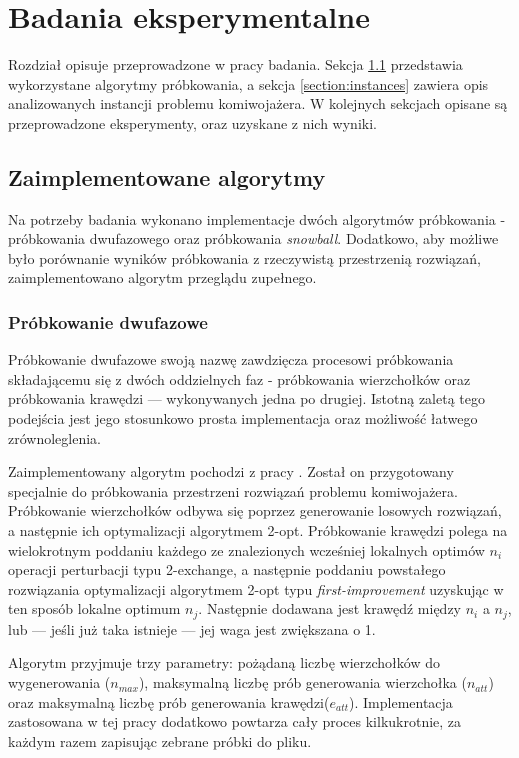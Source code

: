 \chapter{Badania eksperymentalne}

Rozdział opisuje przeprowadzone w pracy badania. Sekcja \ref{section:algorithms} przedstawia wykorzystane algorytmy próbkowania,
a sekcja \ref{section:instances} zawiera opis analizowanych instancji problemu komiwojażera.
W kolejnych sekcjach opisane są przeprowadzone eksperymenty, oraz uzyskane z nich wyniki.

\section{Zaimplementowane algorytmy} \label{section:algorithms}

Na potrzeby badania wykonano implementacje dwóch algorytmów próbkowania - próbkowania dwufazowego oraz próbkowania \textit{snowball}.
Dodatkowo, aby możliwe było porównanie wyników próbkowania z rzeczywistą przestrzenią rozwiązań, zaimplementowano algorytm
przeglądu zupełnego.

\subsection{Próbkowanie dwufazowe} \label{section:tp}
Próbkowanie dwufazowe swoją nazwę zawdzięcza procesowi próbkowania składającemu się z dwóch oddzielnych faz
- próbkowania wierzchołków oraz próbkowania krawędzi --- wykonywanych jedna po drugiej.
Istotną zaletą tego podejścia jest jego stosunkowo prosta implementacja oraz możliwość łatwego zrównoleglenia.

Zaimplementowany algorytm pochodzi z pracy \cite{DBLP:conf/depcos/BozejkoGNAB18}.
Został on przygotowany specjalnie do próbkowania przestrzeni rozwiązań problemu komiwojażera.
Próbkowanie wierzchołków odbywa się poprzez generowanie losowych rozwiązań, a następnie ich optymalizacji algorytmem 2-opt.
Próbkowanie krawędzi polega na wielokrotnym poddaniu każdego ze znalezionych wcześniej lokalnych optimów $n_i$ operacji perturbacji typu 2-exchange,
a następnie poddaniu powstałego rozwiązania optymalizacji algorytmem 2-opt typu \textit{first-improvement} uzyskując w ten sposób lokalne optimum $n_j$.
Następnie dodawana jest krawędź między $n_i$ a $n_j$, lub --- jeśli już taka istnieje --- jej waga jest zwiększana o 1.

Algorytm przyjmuje trzy parametry: pożądaną liczbę wierzchołków do wygenerowania ($n_{max}$), maksymalną liczbę prób generowania wierzchołka ($n_{att}$)
oraz maksymalną liczbę prób generowania krawędzi($e_{att}$).
Implementacja zastosowana w tej pracy dodatkowo powtarza cały proces kilkukrotnie, za każdym razem zapisując zebrane próbki do pliku.

